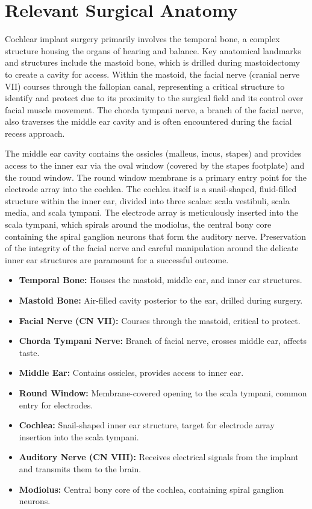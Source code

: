 \section*{Relevant Surgical Anatomy}
Cochlear implant surgery primarily involves the temporal bone, a complex structure housing the organs of hearing and balance. Key anatomical landmarks and structures include the mastoid bone, which is drilled during mastoidectomy to create a cavity for access. Within the mastoid, the facial nerve (cranial nerve VII) courses through the fallopian canal, representing a critical structure to identify and protect due to its proximity to the surgical field and its control over facial muscle movement. The chorda tympani nerve, a branch of the facial nerve, also traverses the middle ear cavity and is often encountered during the facial recess approach.

The middle ear cavity contains the ossicles (malleus, incus, stapes) and provides access to the inner ear via the oval window (covered by the stapes footplate) and the round window. The round window membrane is a primary entry point for the electrode array into the cochlea. The cochlea itself is a snail-shaped, fluid-filled structure within the inner ear, divided into three scalae: scala vestibuli, scala media, and scala tympani. The electrode array is meticulously inserted into the scala tympani, which spirals around the modiolus, the central bony core containing the spiral ganglion neurons that form the auditory nerve. Preservation of the integrity of the facial nerve and careful manipulation around the delicate inner ear structures are paramount for a successful outcome.

\begin{itemize}
  \item \textbf{Temporal Bone:} Houses the mastoid, middle ear, and inner ear structures.
  \item \textbf{Mastoid Bone:} Air-filled cavity posterior to the ear, drilled during surgery.
  \item \textbf{Facial Nerve (CN VII):} Courses through the mastoid, critical to protect.
  \item \textbf{Chorda Tympani Nerve:} Branch of facial nerve, crosses middle ear, affects taste.
  \item \textbf{Middle Ear:} Contains ossicles, provides access to inner ear.
  \item \textbf{Round Window:} Membrane-covered opening to the scala tympani, common entry for electrodes.
  \item \textbf{Cochlea:} Snail-shaped inner ear structure, target for electrode array insertion into the scala tympani.
  \item \textbf{Auditory Nerve (CN VIII):} Receives electrical signals from the implant and transmits them to the brain.
\item \textbf{Modiolus:} Central bony core of the cochlea, containing spiral ganglion neurons.
\end{itemize}

